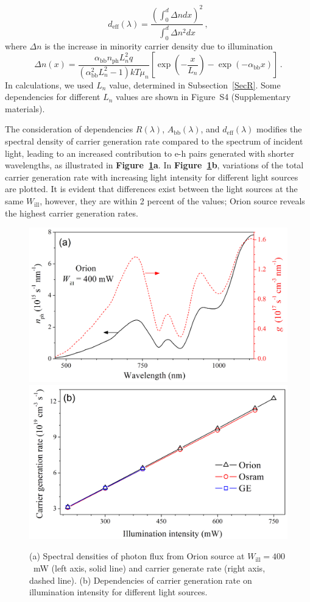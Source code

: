 \documentclass{WileyMSP-template}
\begin{document}
\begin{equation}
\label{eqdeff}
d_\mathrm{eff}(\lambda)=\frac{\left(\int_0^d \Delta n dx\right)^2}{\int_0^d \Delta n^2 dx}\,,
\end{equation}
where
$\Delta n$ is the increase in minority carrier density due to illumination
\begin{equation}
\label{eqdeln}
\Delta n (x)=\frac{\alpha_\mathrm{bb} n_\mathrm{ph} L_n^2 q}{(\alpha_\mathrm{bb}^2 L_n^2-1)kT\mu_n}
\left[\exp\left(-\frac{x}{L_n}\right)-\exp\left(-\alpha_\mathrm{bb} x\right)\right]\,.
\end{equation}
In calculations, we used $L_n$ value, determined in Subsection~\ref{SecR}.
Some dependencies for different $L_n$ values are shown in Figure~S4 (Supplementary materials).

The consideration of dependencies $R(\lambda)$, $A_\mathrm{bb}(\lambda)$, and $d_\mathrm{eff}(\lambda)$ modifies
the spectral density of carrier generation rate compared to the spectrum of incident light,
leading to an increased contribution to e-h pairs generated with shorter wavelengths,
as illustrated in \textbf{Figure~\ref{fig5}a}.
In \textbf{Figure~\ref{fig5}b}, variations of the total carrier generation rate with increasing light intensity for different light sources are plotted.
It is evident that differences exist between the light sources at the same $W_\mathrm{ill}$,
however, they are within 2 percent of the values;
Orion source reveals the highest carrier generation rates.


\begin{figure}
\centering
  \includegraphics[width=0.4\linewidth]{Fig5a.png}
  \includegraphics[width=0.4\linewidth]{Fig5b.png}
  \caption{
  (a) Spectral densities of photon flux from Orion source at $W_\mathrm{ill}=400$~mW (left axis, solid line) and carrier generate rate (right axis, dashed line).
    (b) Dependencies of carrier generation rate on illumination intensity for different light sources.
  }
  \label{fig5}
\end{figure}
\end{document}
